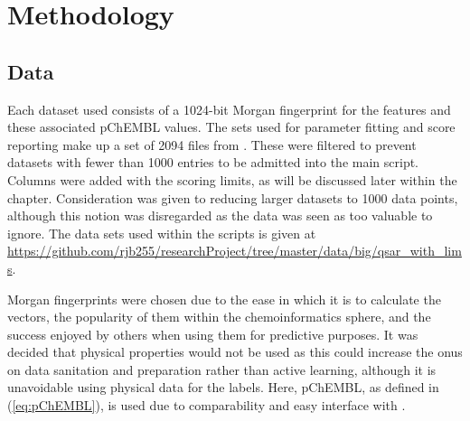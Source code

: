 \chapter{Methodology}
\label{ch:method}

\graphicspath{{Chapter3/Figs/Vector/}{Chapter3/Figs/}}

\section{Data}
Each dataset used consists of a 1024-bit Morgan fingerprint for the features and these associated pChEMBL values. The sets used for parameter fitting and score reporting make up a set of 2094 files from \textcite{CHEMBL}. These were filtered to prevent datasets with fewer than 1000 entries to be admitted into the main script. Columns were added with the scoring limits, as will be discussed later within the chapter. Consideration was given to reducing larger datasets to 1000 data points, although this notion was disregarded as the data was seen as too valuable to ignore. The data sets used within the scripts is given at \url{https://github.com/rjb255/researchProject/tree/master/data/big/qsar_with_lims}.

Morgan fingerprints were chosen due to the ease in which it is to calculate the vectors, the popularity of them within the chemoinformatics sphere, and the success enjoyed by others when using them for predictive purposes. It was decided that physical properties would not be used as this could increase the onus on data sanitation and preparation rather than active learning, although it is unavoidable using physical data for the labels. Here, pChEMBL, as defined in (\ref{eq:pChEMBL}), is used due to comparability and easy interface with \textcite{CHEMBL}.

